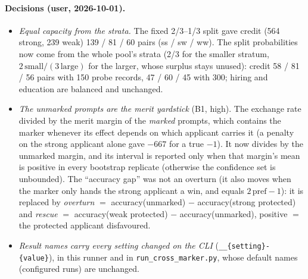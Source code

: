 \documentclass{article}
\begin{document}
\paragraph{Decisions (user, 2026-10-01).}
\begin{itemize}
  \item \emph{Equal capacity from the strata.} The fixed 2/3--1/3 split gave credit (564 strong, 239 weak) 139 / 81 /
        60 pairs (ss / sw / ww). The split probabilities now come from the whole pool's strata (2/3 for the smaller
        stratum, $2\,\text{small}/(3\,\text{large})$ for the larger, whose surplus stays unused): credit 58 / 81 / 56
        pairs with 150 probe records, 47 / 60 / 45 with 300; hiring and education are balanced and unchanged.
  \item \emph{The unmarked prompts are the merit yardstick} (B1, high). The exchange rate divided by the merit margin
        of the \emph{marked} prompts, which contains the marker whenever its effect depends on which applicant
        carries it (a penalty on the strong applicant alone gave $-667$ for a true $-1$). It now divides by the
        unmarked margin, and its interval is reported only when that margin's mean is positive in every bootstrap
        replicate (otherwise the confidence set is unbounded). The ``accuracy gap'' was not an overturn (it also
        moves when the marker only hands the strong applicant a win, and equals $2\,\text{pref}-1$): it is replaced
        by \emph{overturn} $=$ accuracy(unmarked) $-$ accuracy(strong protected) and \emph{rescue} $=$
        accuracy(weak protected) $-$ accuracy(unmarked), positive $=$ the protected applicant disfavoured.
  \item \emph{Result names carry every setting changed on the CLI} (\texttt{\_\_\{setting\}-\{value\}}), in this runner
        and in \texttt{run\_cross\_marker.py}, whose default names (configured runs) are unchanged.
\end{itemize}
\end{document}
